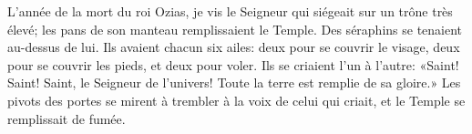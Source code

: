 L’année de la mort du roi Ozias, je vis le Seigneur qui siégeait sur un trône très élevé;
	les pans de son manteau remplissaient le Temple.
Des séraphins se tenaient au-dessus de lui. Ils avaient chacun six ailes:
	deux pour se couvrir le visage, deux pour se couvrir les pieds, et deux pour voler.
Ils se criaient l’un à l’autre: «Saint! Saint! Saint, le Seigneur de l’univers!
	Toute la terre est remplie de sa gloire.»
Les pivots des portes se mirent à trembler à la voix de celui qui criait,
	et le Temple se remplissait de fumée.
